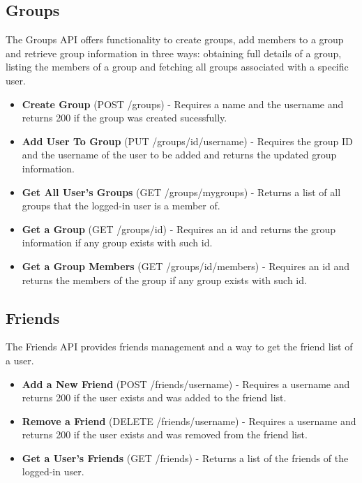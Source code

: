\documentclass[acmart, nonacm]{acmart}
\begin{document}
\subsection{Groups}
The Groups API offers functionality to create groups, add members to a group and retrieve group information in three ways: obtaining full details of a group, listing the members of a group 
and fetching all groups associated with a specific user.
\begin{itemize}
    \item \textbf{Create Group} (POST /groups) - Requires a name and the username and returns 200 if the group was created sucessfully.
    \item \textbf{Add User To Group} (PUT /groups/{id}/{username}) - Requires the group ID and the username of the user to be added and returns the updated group information.
    \item \textbf{Get All User's Groups} (GET /groups/mygroups) - Returns a list of all groups that the logged-in user is a member of.
    \item \textbf{Get a Group} (GET /groups/{id}) - Requires an id and returns the group information if any group exists with such id.
    \item \textbf{Get a Group Members} (GET /groups/{id}/members) - Requires an id and returns the members of the group if any group exists with such id.
\end{itemize}

\subsection{Friends}
The Friends API provides friends management and a way to get the friend list of a user.
\begin{itemize}
    \item \textbf{Add a New Friend} (POST /friends/{username}) - Requires a username and returns 200 if the user exists and was added to the friend list.
    \item \textbf{Remove a Friend} (DELETE /friends/{username}) - Requires a username and returns 200 if the user exists and was removed from the friend list.
    \item \textbf{Get a User's Friends} (GET /friends) - Returns a list of the friends of the logged-in user.
\end{itemize}

\end{document}
